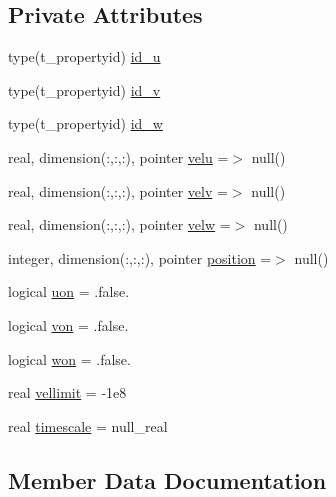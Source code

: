 \subsection*{Private Attributes}
\begin{DoxyCompactItemize}
\item 
type(t\+\_\+propertyid) \mbox{\hyperlink{structmodulehydrodynamic_1_1t__scraper_aacaf003dd9543f005daf96127f0f4090}{id\+\_\+u}}
\item 
type(t\+\_\+propertyid) \mbox{\hyperlink{structmodulehydrodynamic_1_1t__scraper_ac5599d79d109cae4cd40f478e83559b9}{id\+\_\+v}}
\item 
type(t\+\_\+propertyid) \mbox{\hyperlink{structmodulehydrodynamic_1_1t__scraper_a390f3581938e19a100e0e37be25c2a6d}{id\+\_\+w}}
\item 
real, dimension(\+:,\+:,\+:), pointer \mbox{\hyperlink{structmodulehydrodynamic_1_1t__scraper_aa0cfbc104a580159849f8bfe1aaf58f4}{velu}} =$>$ null()
\item 
real, dimension(\+:,\+:,\+:), pointer \mbox{\hyperlink{structmodulehydrodynamic_1_1t__scraper_a8467c2e83ebe7fba9a2b9088797fc073}{velv}} =$>$ null()
\item 
real, dimension(\+:,\+:,\+:), pointer \mbox{\hyperlink{structmodulehydrodynamic_1_1t__scraper_ad5b9e9b68acabcb9950dc9d2d7d48208}{velw}} =$>$ null()
\item 
integer, dimension(\+:,\+:,\+:), pointer \mbox{\hyperlink{structmodulehydrodynamic_1_1t__scraper_acbe6aea2e1690c2d80c4101713e31e9d}{position}} =$>$ null()
\item 
logical \mbox{\hyperlink{structmodulehydrodynamic_1_1t__scraper_a9faa5a24bcc16dfd16d50cae530a8ae8}{uon}} = .false.
\item 
logical \mbox{\hyperlink{structmodulehydrodynamic_1_1t__scraper_ae18b64a5d1a645471dda71cfce67ce30}{von}} = .false.
\item 
logical \mbox{\hyperlink{structmodulehydrodynamic_1_1t__scraper_aa5762cce7c1f06eb2e71a8b1725af272}{won}} = .false.
\item 
real \mbox{\hyperlink{structmodulehydrodynamic_1_1t__scraper_ac5d0c6749136a2774efd2e027483c807}{vellimit}} = -\/1e8
\item 
real \mbox{\hyperlink{structmodulehydrodynamic_1_1t__scraper_af1ef90664bbce260e04c3bb27bcad6c2}{timescale}} = null\+\_\+real
\end{DoxyCompactItemize}


\subsection{Member Data Documentation}
\mbox{\label{structmodulehydrodynamic_1_1t__scraper_aacaf003dd9543f005daf96127f0f4090}} 
